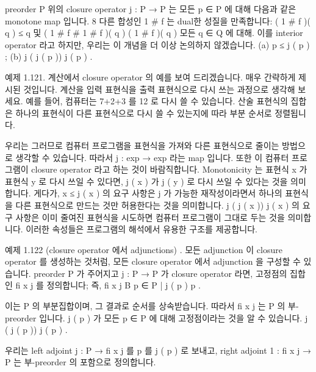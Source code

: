 \documentclass[11pt, a4paper, twoside, openany]{book}
\begin{document}
\par\medskip
\begin{definitionbox}[정의 1.120.]
preorder P 위의 closure operator j : P → P 는 모든 p ∈ P 에 대해 다음과 같은 monotone map 입니다.
8 다른 합성인 1 \# f 는 dual\hspace{0pt}한 성질을 만족합니다: ( 1 \# f )( q ) ≤ q  및 ( 1 \# f \# 1 \# f )( q )  ( 1 \# f )( q ) 모든 q ∈ Q 에 대해. 이를 interior operator 라고 하지만, 우리는 이 개념을 더 이상 논의하지 않겠습니다.
(a) p ≤ j ( p ) ;
(b) j ( j ( p ))  j ( p ) .
\end{definitionbox}

\par\medskip
예제 1.121. 계산에서 closure operator 의 예를 보여 드리겠습니다. 매우 간략하게 제시된 것입니다. 계산을 입력 표현식을 출력 표현식으로 다시 쓰는 과정으로 생각해 보세요. 예를 들어, 컴퓨터는 7+2+3 를 12 로 다시 쓸 수 있습니다. 산술 표현식의 집합은 하나의 표현식이 다른 표현식으로 다시 쓸 수 있는지에 따라 부분 순서로 정렬됩니다.

\par\medskip
우리는 그러므로 컴퓨터 프로그램을 표현식을 가져와 다른 표현식으로 줄이는 방법으로 생각할 수 있습니다. 따라서 j : exp → exp 라는 map 입니다. 또한 이 컴퓨터 프로그램이 closure operator 라고 하는 것이 바람직합니다. Monotonicity 는 표현식 x 가 표현식 y 로 다시 쓰일 수 있다면, j ( x ) 가 j ( y ) 로 다시 쓰일 수 있다는 것을 의미합니다. 게다가, x ≤ j ( x ) 의 요구 사항은 j 가 가능한 재작성이라면서 하나의 표현식을 다른 표현식으로 만드는 것만 허용한다는 것을 의미합니다. j ( j ( x ))  j ( x ) 의 요구 사항은 이미 줄여진 표현식을 시도하면 컴퓨터 프로그램이 그대로 두는 것을 의미합니다. 이러한 속성들은 프로그램의 해석에서 유용한 구조를 제공합니다.

\par\medskip
예제 1.122 (closure operator 에서 adjunctions) . 모든 adjunction 이 closure operator 를 생성하는 것처럼, 모든 closure operator 에서 adjunction 을 구성할 수 있습니다.
preorder P 가 주어지고 j : P → P 가 closure operator 라면, 고정점의 집합인 fi x j 를 정의합니다; 즉,
fi x j B { p ∈ P | j ( p )  p } .

\par\medskip
이는 P 의 부분집합이며, 그 결과로 순서를 상속받습니다. 따라서 fi x j 는 P 의 부-preorder 입니다. j ( p ) 가 모든 p ∈ P 에 대해 고정점이라는 것을 알 수 있습니다.
j ( j ( p ))  j ( p ) .

\par\medskip
우리는 left adjoint j : P → fi x j 를 p 를 j ( p ) 로 보내고, right adjoint 1 : fi x j → P 는 부-preorder 의 포함으로 정의합니다.
\end{document}
